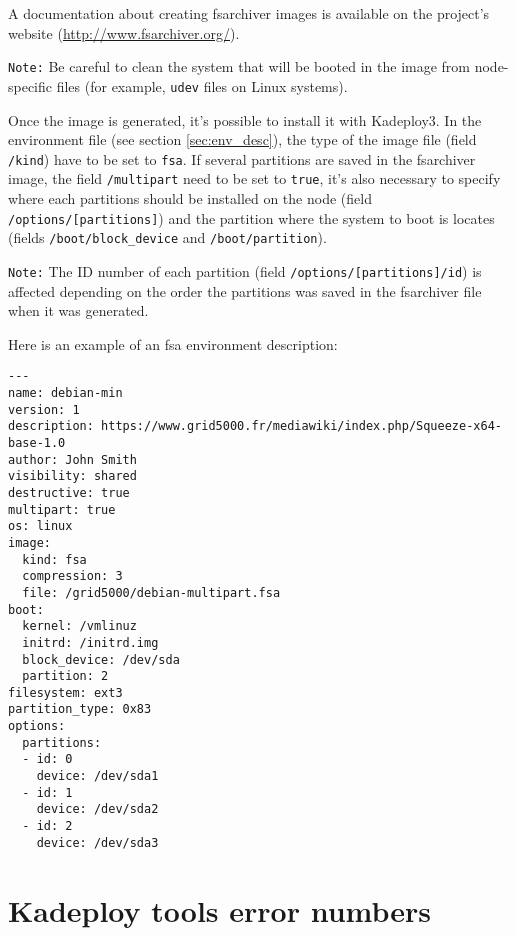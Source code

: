 \documentclass[a4wide,10pt,oneside]{book}
\newcommand{\ypath}[1]{\texttt{#1}}
\begin{document}
A documentation about creating fsarchiver images is available on the project's website (\url{http://www.fsarchiver.org/}).

\texttt{Note:} Be careful to clean the system that will be booted in the image from node-specific files (for example, \texttt{udev} files on Linux systems).

Once the image is generated, it's possible to install it with Kadeploy3. In the environment file (see section \ref{sec:env_desc}), the type of the image file (field \ypath{/kind}) have to be set to \texttt{fsa}. If several partitions are saved in the fsarchiver image, the field \ypath{/multipart} need to be set to \texttt{true}, it's also necessary to specify where each partitions should be installed on the node (field \ypath{/options/[partitions]}) and the partition where the system to boot is locates (fields \ypath{/boot/block\_device} and \ypath{/boot/partition}).

\texttt{Note:} The ID number of each partition (field \ypath{/options/[partitions]/id}) is affected depending on the order the partitions was saved in the fsarchiver file when it was generated.

Here is an example of an fsa environment description:
\begin{small}
\begin{verbatim}
---
name: debian-min
version: 1
description: https://www.grid5000.fr/mediawiki/index.php/Squeeze-x64-base-1.0
author: John Smith
visibility: shared
destructive: true
multipart: true
os: linux
image:
  kind: fsa
  compression: 3
  file: /grid5000/debian-multipart.fsa
boot:
  kernel: /vmlinuz
  initrd: /initrd.img
  block_device: /dev/sda
  partition: 2
filesystem: ext3
partition_type: 0x83
options:
  partitions:
  - id: 0
    device: /dev/sda1
  - id: 1
    device: /dev/sda2
  - id: 2
    device: /dev/sda3
\end{verbatim}
\end{small}



\section{Kadeploy tools error numbers}\label{sec:fsa}
\end{document}
